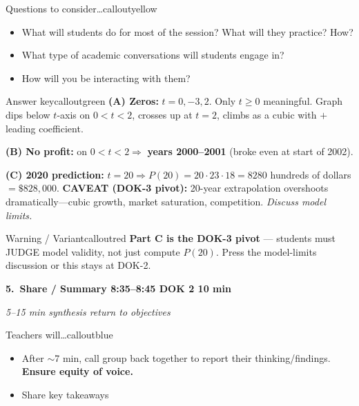 \documentclass[10pt]{article}
\newcommand{\phasehead}[6]{%
  \vspace{0.25em}
  \noindent\colorbox{tealheader}{\parbox{\dimexpr\linewidth-2\fboxsep}{%
    \color{white}\bfseries #1.\ #2 \hfill \normalfont\bfseries #3 \textbullet{} DOK #4 \textbullet{} #5 min%
  }}\par
  {\small\itshape\color{framegray}#6}\par
  \smallskip
}
\begin{document}
\begin{callout}{\IconPuzzle{} Questions to consider\ldots}{calloutyellow}
\begin{itemize}[leftmargin=1.4em,itemsep=1pt,topsep=1pt]
  \item What will students do for most of the session? What will they practice? How?
  \item What type of academic conversations will students engage in?
  \item How will you be interacting with them?
\end{itemize}
\end{callout}

\begin{callout}{\IconStar{} Answer key}{calloutgreen}
\textbf{(A) Zeros:} $t = 0, -3, 2$. Only $t \ge 0$ meaningful. Graph dips below $t$-axis on $0 < t < 2$, crosses up at $t = 2$, climbs as a cubic with $+$ leading coefficient.\par
\textbf{(B) No profit:} on $0 < t < 2 \Rightarrow$ \textbf{years 2000--2001} (broke even at start of 2002).\par
\textbf{(C) 2020 prediction:} $t = 20 \Rightarrow P(20) = 20 \cdot 23 \cdot 18 = 8280$ hundreds of dollars $= \$828{,}000$. \textbf{CAVEAT (DOK-3 pivot):} 20-year extrapolation overshoots dramatically---cubic growth, market saturation, competition. \emph{Discuss model limits.}
\end{callout}

\begin{callout}{\IconWarn{} Warning / Variant}{calloutred}
\textbf{Part C is the DOK-3 pivot} --- students must JUDGE model validity, not just compute $P(20)$. Press the model-limits discussion or this stays at DOK-2.
\end{callout}

\phasehead{5}{Share / Summary}{8:35--8:45}{2}{10}{5--15 min \textbullet{} synthesis \textbullet{} return to objectives}

\begin{callout}{\IconSpeak{} Teachers will\ldots}{calloutblue}
\begin{itemize}[leftmargin=1.4em,itemsep=1pt,topsep=1pt]
  \item After $\sim$7 min, call group back together to report their thinking/findings. \textbf{Ensure equity of voice.}
  \item Share key takeaways
\end{itemize}
\end{callout}
\end{document}
